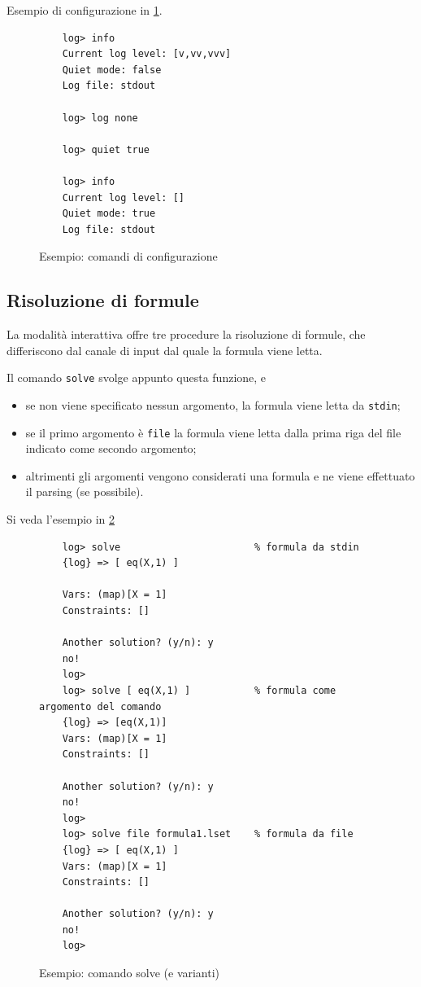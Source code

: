 \documentclass[12pt,a4paper,openright]{book}  %
\begin{document}
Esempio di configurazione in \ref{fig:example_confcommands}.

\begin{figure}
	\begin{verbatim}
	log> info
	Current log level: [v,vv,vvv]
	Quiet mode: false
	Log file: stdout

	log> log none

	log> quiet true

	log> info
	Current log level: []
	Quiet mode: true
	Log file: stdout
	\end{verbatim}
	\caption{Esempio: comandi di configurazione}
	\label{fig:example_confcommands}
\end{figure}

\subsection{Risoluzione di formule}

La modalità interattiva offre tre procedure la risoluzione di formule,
che differiscono dal canale di input dal quale la formula viene letta.

Il comando \texttt{solve} svolge appunto questa funzione, e
\begin{itemize}
	\item se non viene specificato nessun argomento, la formula
          viene letta da \texttt{stdin};
	\item se il primo argomento è \texttt{file} la formula viene
          letta dalla prima riga del file indicato come secondo
          argomento;
	\item altrimenti gli argomenti vengono considerati una formula
          e ne viene effettuato il parsing (se possibile).
\end{itemize}

Si veda l'esempio in \ref{fig:example_solvecommands}

\begin{figure}
	\begin{verbatim}
	log> solve                       % formula da stdin
	{log} => [ eq(X,1) ]

	Vars: (map)[X = 1]
	Constraints: []

	Another solution? (y/n): y
	no!
	log>
	log> solve [ eq(X,1) ]           % formula come argomento del comando
	{log} => [eq(X,1)]
	Vars: (map)[X = 1]
	Constraints: []

	Another solution? (y/n): y
	no!
	log>
	log> solve file formula1.lset    % formula da file
	{log} => [ eq(X,1) ]
	Vars: (map)[X = 1]
	Constraints: []

	Another solution? (y/n): y
	no!
	log>
	\end{verbatim}
	\caption{Esempio: comando solve (e varianti)}
	\label{fig:example_solvecommands}
\end{figure}
\end{document}
